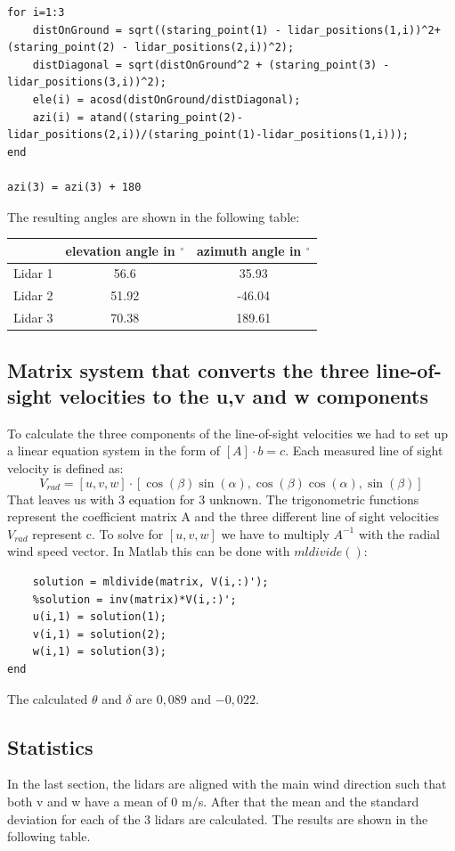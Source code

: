 \documentclass[10pt]{article}
\begin{document}
\begin{lstlisting}
for i=1:3
    distOnGround = sqrt((staring_point(1) - lidar_positions(1,i))^2+(staring_point(2) - lidar_positions(2,i))^2);
    distDiagonal = sqrt(distOnGround^2 + (staring_point(3) - lidar_positions(3,i))^2);
    ele(i) = acosd(distOnGround/distDiagonal);
    azi(i) = atand((staring_point(2)-lidar_positions(2,i))/(staring_point(1)-lidar_positions(1,i)));
end

azi(3) = azi(3) + 180
\end{lstlisting}

The resulting angles are shown in the following table:\\

\begin{tabular}{c||c|c|}
& elevation angle in $^\circ$& azimuth angle in $^\circ$\\
\hline
Lidar 1 &56.6 & 35.93 \\
Lidar 2 &51.92 & -46.04\\
Lidar 3 & 70.38& 189.61\\
\end{tabular}
\subsection{Matrix system that converts the three line-of-sight velocities to the u,v and w components}
To calculate the three components of the line-of-sight velocities we had to set up a linear equation system in the form of $[A] \cdot b = c$. 
Each measured line of sight velocity is defined as:
\begin{equation*}
V_{rad} = [u, v ,w]\cdot[\cos(\beta)\sin(\alpha), \cos(\beta)\cos(\alpha), \sin(\beta)]
\end{equation*}
That leaves us with 3 equation for 3 unknown. 
The trigonometric functions represent the coefficient matrix A and the three different line of sight velocities $V_{rad}$ represent c.
To solve for $[u,v,w]$ we have to multiply $A^{-1}$ with the radial wind speed vector.
In Matlab this can be done with $mldivide()$:\newpage

\begin{lstlisting}
    solution = mldivide(matrix, V(i,:)');
    %solution = inv(matrix)*V(i,:)';
    u(i,1) = solution(1);
    v(i,1) = solution(2);
    w(i,1) = solution(3);
end
\end{lstlisting}

The calculated $\theta$ and $\delta$ are $0,089$ and $-0,022$.
\subsection{Statistics}
In the last section, the lidars are aligned with the main wind direction  such that both v and w have a mean of 0 m/s. After that the mean and the standard deviation for each of the 3 lidars are calculated. The results are shown in the following table.\\
\end{document}
